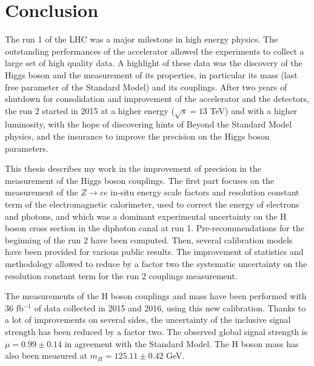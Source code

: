 \chapter{Conclusion}

The run 1 of the LHC was a major milestone in high energy physics.
The outstanding performances of the accelerator allowed the experiments to collect a large set of high quality data.
A highlight of these data was the discovery of the Higgs boson and the measurement of its properties, in particular its mass (last free parameter of the Standard Model) and its couplings.
After two years of shutdown for consolidation and improvement of the accelerator and the detectors, the run 2 started in 2015 at a higher energy ($\sqrt{s}=13$ TeV) and with a higher luminosity, with the hope of discovering hints of Beyond the Standard Model physics, and the insurance to improve the precision on the Higgs boson parameters.

This thesis describes my work in the improvement of precision in the measurement of the Higgs boson couplings.
The first part focuses on the measurement of the $Z\rightarrow ee$ in-situ energy scale factors and resolution constant term of the electromagnetic calorimeter, used to correct the energy of electrons and photons, and which was a dominant experimental uncertainty on the H boson cross section in the diphoton canal at run 1.
Pre-recommendations for the beginning of the run 2 have been computed.
Then, several calibration models have been provided for various public results.
The improvement of statistics and methodology allowed to reduce by a factor two the systematic uncertainty on the resolution constant term for the run 2 couplings measurement.

The measurements of the H boson couplings and mass have been performed with $36$ fb$^{-1}$ of data collected in 2015 and 2016, using this new calibration.
Thanks to a lot of improvements on several sides, the uncertainty of the inclusive signal strength has been reduced by a factor two.
The observed global signal strength is $\mu=0.99 \pm 0.14$ in agreement with the Standard Model.
The H boson mass has also been measured at $m_H=125.11\pm 0.42$ GeV.
